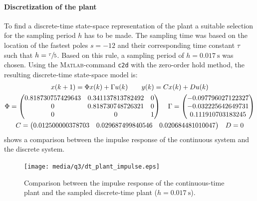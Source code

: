 \paragraph{Discretization of the plant}
To find a discrete-time state-space representation of the plant a suitable selection for the sampling period $h$ has to be made. The sampling time was based on the location of the fastest poles $s = -12$ and their corresponding time constant $\tau$ such that $h = \sfrac{\tau}{5}$. Based on this rule, a sampling period of $h = \SI{0.017}{\second}$ was chosen. Using the \textsc{Matlab}-command \texttt{c2d} with the zero-order hold method, the resulting discrete-time state-space model is:
\begin{equation}
    \begin{gathered}
        x(k+1) = \Phi x(k) + \Gamma u(k) \qquad y(k) = Cx(k) + Du(k)\\
        \Phi = 
        \begin{pmatrix}   
            0.818730757429643 &  0.341137813782492 &   0\\
            0 & 0.818730748726321 & 0\\
            0  &  0 &  1\\
        \end{pmatrix}\quad
        \Gamma = \begin{pmatrix}
            -0.097796027122327\\
            -0.032225642649731\\
             0.111910703183245\\
        \end{pmatrix}\\
        C = \mqty(0.012500000378703 & 0.029687499840546 & 0.020684481010047) \quad D = 0
    \end{gathered}
\end{equation}
 shows a comparison between the impulse response of the continuous system and the discrete system.
\begin{figure}
    \centering
    \texttt{[image: media/q3/dt\_plant\_impulse.eps]}
    \caption{Comparison between the impulse response of the continuous-time plant and the sampled discrete-time plant ($h = \SI{0.017}{\second}$).}
    \label{fig:q3_dt_plant_impulse}
\end{figure}

